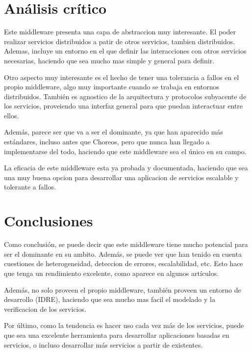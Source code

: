 \documentclass[runningheads]{llncs}
\begin{document}
\section{Análisis crítico}
Este middleware presenta una capa de abstraccion muy interesante. El poder realizar servicios distribuidos a patir de otros servicios, tambien distribuidos. Ademas, incluye un entorno en el que definir las interacciones con otros servicios necesarias, haciendo que sea mucho mas simple y general para definir.

Otro aspecto muy interesante es el hecho de tener una tolerancia a fallos en el propio middleware, algo muy importante cuando se trabaja en entornos distribuidos. También es agnostico de la arquitectura y protocolos subyacente de los servicios, proveiendo una interfaz general para que puedan interactuar entre ellos.

Además, parece ser que va a ser el dominante, ya que han aparecido más estándares, incluso antes que Choreos, pero que nunca han llegado a implementarse del todo, haciendo que este middleware sea el único en su campo.

La eficacia de este middleware esta ya probada y documentada, haciendo que sea una muy buena opcion para desarrollar una aplicacion de servicios escalable y tolerante a fallos.

\section{Conclusiones}
Como conclusión, se puede decir que este middleware tiene mucho potencial para ser el dominante en su ambito. Además, se puede ver que han tenido en cuenta cuestiones de heterogeneidad, deteccion de errores, escalabilidad, etc. Esto hace que tenga un rendimiento excelente, como aparece en algunos artículos.

Además, no solo proveen el propio middleware, también proveen un entorno de desarrollo (IDRE), haciendo que sea mucho mas facil el modelado y la verificacion de los servicios.

Por último, como la tendencia es hacer uso cada vez más de los servicios, puede que sea una excelente herramienta para desarrollar aplicaciones basadas en servicios, o incluso desarrollar más servicios a partir de existentes.
\end{document}
